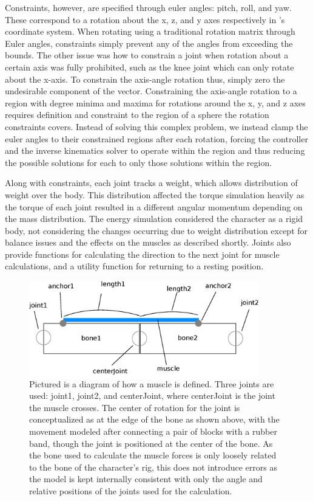 Constraints, however, are specified through euler angles: pitch, roll, and yaw.  These correspond to a rotation about the x, z, and y axes respectively in \unity{}'s coordinate system.  When rotating using a traditional rotation matrix through Euler angles, constraints simply prevent any of the angles from exceeding the bounds.  The other issue was how to constrain a joint when rotation about a certain axis was fully prohibited, such as the knee joint which can only rotate about the x-axis.  To constrain the axis-angle rotation thus, simply zero the undesirable component of the vector.  Constraining the axis-angle rotation to a region with degree minima and maxima for rotations around the x, y, and z axes requires definition and constraint to the region of a sphere the rotation constraints covers.  Instead of solving this complex problem, we instead clamp the euler angles to their constrained regions after each rotation, forcing the controller and the inverse kinematics solver to operate within the region and thus reducing the possible solutions for each to only those solutions within the region.

Along with constraints, each joint tracks a weight, which allows distribution of weight over the body.  This distribution affected the torque simulation heavily as the torque of each joint resulted in a different angular momentum depending on the mass distribution.  The energy simulation considered the character as a rigid body, not considering the changes occurring due to weight distribution except for balance issues and the effects on the muscles as described shortly.  Joints also provide functions for calculating the direction to the next joint for muscle calculations, and a utility function for returning to a resting position.

\begin{figure}[ht]
	\centering
	\includegraphics[width=10cm]{images/spring_calc/spring_anchors.eps}
	\caption[Diagram of muscle definition showing anchor points and joints used for specification]{Pictured is a diagram of how a muscle is defined.  Three joints are used: joint1, joint2, and centerJoint, where centerJoint is the joint the muscle crosses.  The center of rotation for the joint is conceptualized as at the edge of the bone as shown above, with the movement modeled after connecting a pair of blocks with a rubber band, though the joint is positioned at the center of the bone.  As the bone used to calculate the muscle forces is only loosely related to the bone of the character's rig, this does not introduce errors as the model is kept internally consistent with only the angle and relative positions of the joints used for the calculation.}
	\label{fig:muscle_anchors}
\end{figure}

